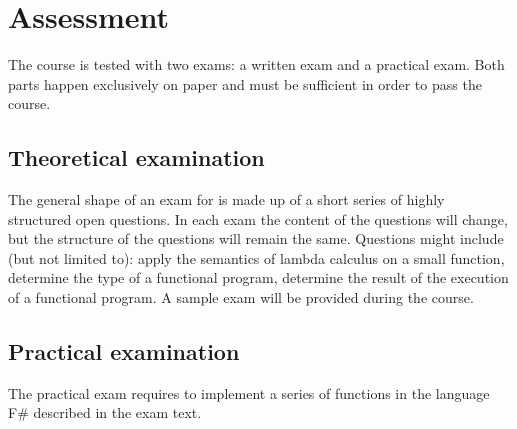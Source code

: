 \section{Assessment}
The course is tested with two exams: a written exam and a practical exam. Both parts happen exclusively on paper and must be sufficient in order to pass the course.


\subsection{Theoretical examination \modulecode}
The general shape of an exam for \texttt{\modulecode} is made up of a short series of highly structured open questions.
In each exam the content of the questions will change, but the structure of the questions will remain the same. Questions might include (but not limited to): apply the semantics of lambda calculus on a small function, determine the type of a functional program, determine the result of the execution of a functional program. A sample exam will be provided during the course.

\subsection{Practical examination \modulecode}
The practical exam requires to implement a series of functions in the language F\# described in the exam text.
